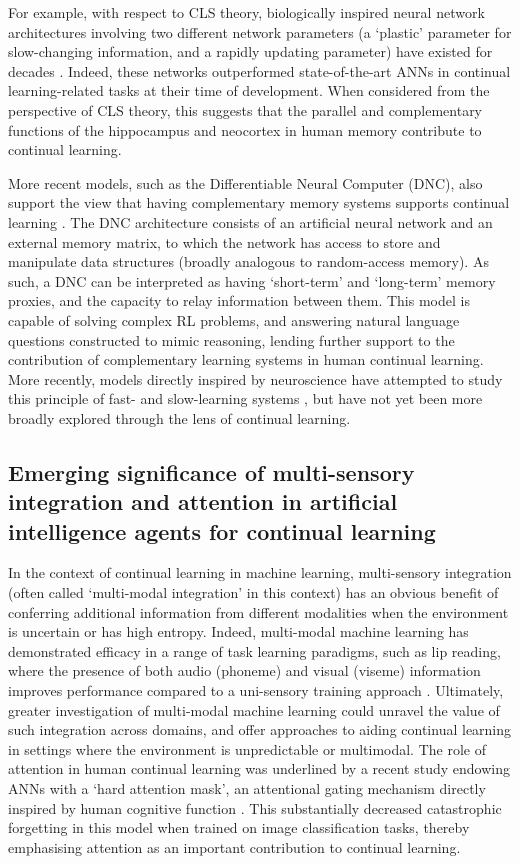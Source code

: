 \documentclass{article} %
\begin{document}
For example, with respect to CLS theory, biologically inspired neural network architectures involving two different network parameters (a ‘plastic’ parameter for slow-changing information, and a rapidly updating parameter) have existed for decades \citep{hinton1987using}. Indeed, these networks outperformed state-of-the-art ANNs in continual learning-related tasks at their time of development. When considered from the perspective of CLS theory, this suggests that the parallel and complementary functions of the hippocampus and neocortex in human memory contribute to continual learning.

More recent models, such as the Differentiable Neural Computer (DNC), also support the view that having complementary memory systems supports continual learning \citep{graves2016hybrid}. The DNC architecture consists of an artificial neural network and an external memory matrix, to which the network has access to store and manipulate data structures (broadly analogous to random-access memory). As such, a DNC can be interpreted as having ‘short-term’ and ‘long-term’ memory proxies, and the capacity to relay information between them. This model is capable of solving complex RL problems, and answering natural language questions constructed to mimic reasoning, lending further support to the contribution of complementary learning systems in human continual learning. More recently, models directly inspired by neuroscience have attempted to study this principle of fast- and slow-learning systems \citep{whittington2020tolman}, but have not yet been more broadly explored through the lens of continual learning.

\subsection*{Emerging significance of multi-sensory integration and attention in artificial intelligence agents for continual learning}

In the context of continual learning in machine learning, multi-sensory integration (often called ‘multi-modal integration’ in this context) has an obvious benefit of conferring additional information from different modalities when the environment is uncertain or has high entropy. Indeed, multi-modal machine learning has demonstrated efficacy in a range of task learning paradigms, such as lip reading, where the presence of both audio (phoneme) and visual (viseme) information improves performance compared to a uni-sensory training approach \citep{ngiam2011multimodal}. Ultimately, greater investigation of multi-modal machine learning could unravel the value of such integration across domains, and offer approaches to aiding continual learning in settings where the environment is unpredictable or multimodal. The role of attention in human continual learning was underlined by a recent study endowing ANNs with a ‘hard attention mask’, an attentional gating mechanism directly inspired by human cognitive function \citep{serra2018overcoming}. This substantially decreased catastrophic forgetting in this model when trained on image classification tasks, thereby emphasising attention as an important contribution to continual learning.
\end{document}
